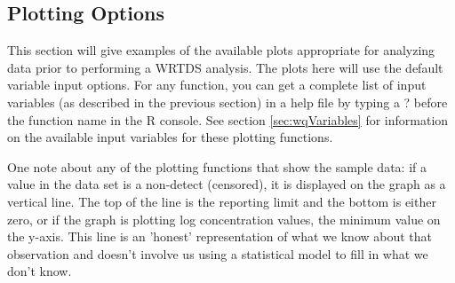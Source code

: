 \documentclass[a4paper,11pt]{article}\usepackage[]{graphicx}\usepackage[]{color}
\begin{document}
\subsection{Plotting Options}
\label{sec:plotOptionsWQ}
\FloatBarrier

This section will give examples of the available plots appropriate for analyzing data prior to performing a WRTDS analysis. The plots here will use the default variable input options.  For any function, you can get a complete list of input variables (as described in the previous section) in a help file by typing a ? before the function name in the R console. See section \ref{sec:wqVariables} for information on the available input variables for these plotting functions.

One note about any of the plotting functions that show the sample data: if a value in the data set is a non-detect (censored), it is displayed on the graph as a vertical line.  The top of the line is the reporting limit and the bottom is either zero, or if the graph is plotting log concentration values, the minimum value on the y-axis.  This line is an 'honest' representation of what we know about that observation and doesn't involve us using a statistical model to fill in what we don't know. 
\end{document}
